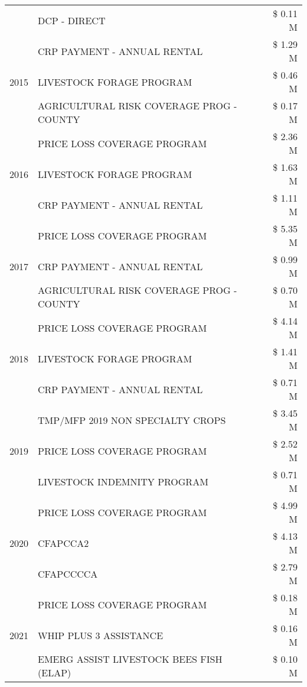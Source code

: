\begin{tabular}{llr}
 & DCP - DIRECT & \$ 0.11 M \\
\cline{1-3}
\multirow[t]{3}{*}{2015} & CRP PAYMENT - ANNUAL RENTAL & \$ 1.29 M \\
 & LIVESTOCK FORAGE PROGRAM & \$ 0.46 M \\
 & AGRICULTURAL RISK COVERAGE PROG - COUNTY & \$ 0.17 M \\
\cline{1-3}
\multirow[t]{3}{*}{2016} & PRICE LOSS COVERAGE PROGRAM & \$ 2.36 M \\
 & LIVESTOCK FORAGE PROGRAM & \$ 1.63 M \\
 & CRP PAYMENT - ANNUAL RENTAL & \$ 1.11 M \\
\cline{1-3}
\multirow[t]{3}{*}{2017} & PRICE LOSS COVERAGE PROGRAM & \$ 5.35 M \\
 & CRP PAYMENT - ANNUAL RENTAL & \$ 0.99 M \\
 & AGRICULTURAL RISK COVERAGE PROG - COUNTY & \$ 0.70 M \\
\cline{1-3}
\multirow[t]{3}{*}{2018} & PRICE LOSS COVERAGE PROGRAM & \$ 4.14 M \\
 & LIVESTOCK FORAGE PROGRAM & \$ 1.41 M \\
 & CRP PAYMENT - ANNUAL RENTAL & \$ 0.71 M \\
\cline{1-3}
\multirow[t]{3}{*}{2019} & TMP/MFP 2019 NON SPECIALTY CROPS & \$ 3.45 M \\
 & PRICE LOSS COVERAGE PROGRAM & \$ 2.52 M \\
 & LIVESTOCK INDEMNITY PROGRAM & \$ 0.71 M \\
\cline{1-3}
\multirow[t]{3}{*}{2020} & PRICE LOSS COVERAGE PROGRAM & \$ 4.99 M \\
 & CFAPCCA2 & \$ 4.13 M \\
 & CFAPCCCCA & \$ 2.79 M \\
\cline{1-3}
\multirow[t]{3}{*}{2021} & PRICE LOSS COVERAGE PROGRAM & \$ 0.18 M \\
 & WHIP PLUS 3 ASSISTANCE & \$ 0.16 M \\
 & EMERG ASSIST LIVESTOCK BEES FISH (ELAP) & \$ 0.10 M \\
\cline{1-3}
\bottomrule
\end{tabular}
